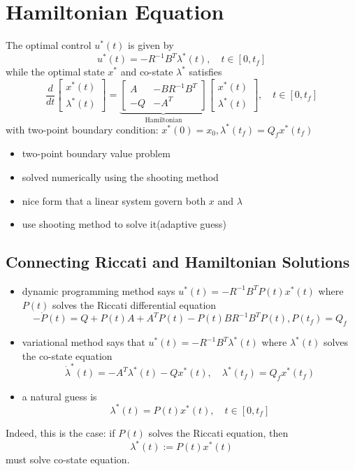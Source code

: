 \documentclass[10pt,a4paper,oneside]{article}
\begin{document}
\section{Hamiltonian Equation}
The optimal control $u^*(t)$ is given by
\[
u^{*}(t)=-R^{-1} B^{T} \lambda^{*}(t), \quad t \in\left[0, t_{f}\right]
\]
while the optimal state $x^*$ and co-state $\lambda^*$ satisfies
\[
\frac{d}{d t}\left[\begin{array}{l}{x^{*}(t)} \\ {\lambda^{*}(t)}\end{array}\right]=\underbrace{\left[\begin{array}{cc}{A} & {-B R^{-1} B^{T}} \\ {-Q} & {-A^{T}}\end{array}\right]}_{\text { Hamiltonian }}\left[\begin{array}{c}{x^{*}(t)} \\ {\lambda^{*}(t)}\end{array}\right], \quad t \in\left[0, t_{f}\right]
\]
with two-point boundary condition: $x^{*}(0)=x_{0}, \lambda^{*}\left(t_{f}\right)=Q_{f} x^{*}\left(t_{f}\right)$
\begin{itemize}
\item two-point boundary value problem
\item solved numerically using the shooting method
\item nice form that a linear system govern both $x$ and $\lambda$
\item use shooting method to solve it(adaptive guess)
\end{itemize}

\subsection{Connecting Riccati and Hamiltonian Solutions}
\begin{itemize}
\item dynamic programming method says $u^{*}(t)=-R^{-1} B^{T} P(t) x^{*}(t)$ where $P(t)$ solves the Riccati differential equation
$$
-\dot{P}(t)=Q+P(t) A+A^{T} P(t)-P(t) B R^{-1} B^{T} P(t), P\left(t_{f}\right)=Q_{f}
$$
\item variational method says that $u^{*}(t)=-R^{-1} B^{T} \lambda^{*}(t)$ where $\lambda^*(t)$ solves the co-state equation
$$
\dot{\lambda}^{*}(t)=-A^{T} \lambda^{*}(t)-Q x^{*}(t), \quad \lambda^{*}\left(t_{f}\right)=Q_{f} x^{*}\left(t_{f}\right)
$$
\item a natural guess is 
$$
\lambda^{*}(t)=P(t) x^{*}(t), \quad t \in\left[0, t_{f}\right]
$$ 
\end{itemize}
Indeed, this is the case: if $P(t)$ solves the Riccati equation, then
\[
\lambda^{*}(t) :=P(t) x^{*}(t)
\]
must solve co-state equation.
\end{document}
